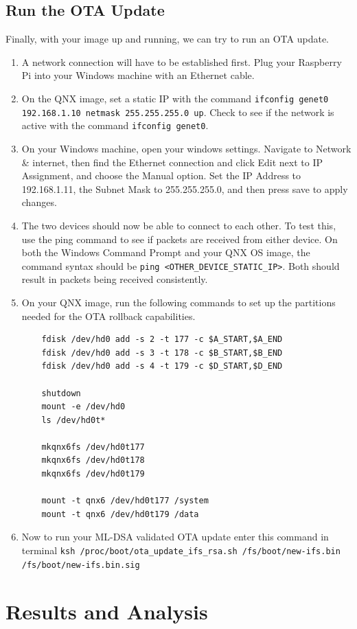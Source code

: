 \documentclass[12pt]{article}
\begin{document}
\subsection{Run the OTA Update}
Finally, with your image up and running, we can try to run an OTA update.
\begin{enumerate}
    \item A network connection will have to be established first. Plug your Raspberry Pi into your Windows machine with an Ethernet cable.
    \item On the QNX image, set a static IP with the command \texttt{ifconfig genet0 192.168.1.10 netmask 255.255.255.0 up}. Check to see if the network is active with the command \texttt{ifconfig genet0}.
    \item On your Windows machine, open your windows settings. Navigate to Network \& internet, then find the Ethernet connection and click Edit next to IP Assignment, and choose the Manual option. Set the IP Address to 192.168.1.11, the Subnet Mask to 255.255.255.0, and then press save to apply changes.
    \item The two devices should now be able to connect to each other. To test this, use the ping command to see if packets are received from either device. On both the Windows Command Prompt and your QNX OS image, the command syntax should be \texttt{ping <OTHER\_DEVICE\_STATIC\_IP>}. Both should result in packets being received consistently.
    \item On your QNX image, run the following commands to set up the partitions needed for the OTA rollback capabilities.
    \begin{verbatim}
    fdisk /dev/hd0 add -s 2 -t 177 -c $A_START,$A_END
    fdisk /dev/hd0 add -s 3 -t 178 -c $B_START,$B_END
    fdisk /dev/hd0 add -s 4 -t 179 -c $D_START,$D_END

    shutdown
    mount -e /dev/hd0
    ls /dev/hd0t*
    
    mkqnx6fs /dev/hd0t177
    mkqnx6fs /dev/hd0t178
    mkqnx6fs /dev/hd0t179

    mount -t qnx6 /dev/hd0t177 /system
    mount -t qnx6 /dev/hd0t179 /data
    \end{verbatim}
     \item Now to run your ML-DSA validated OTA update enter this command in terminal \texttt{ksh /proc/boot/ota\_update\_ifs\_rsa.sh /fs/boot/new-ifs.bin /fs/boot/new-ifs.bin.sig} 
\end{enumerate}

\section{Results and Analysis}
\end{document}
